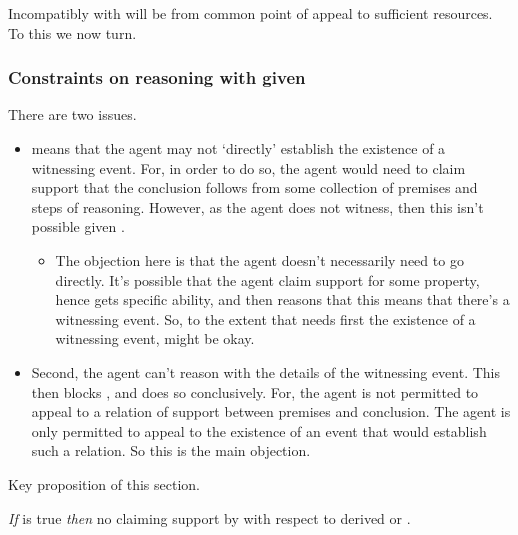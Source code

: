 \begin{note}
  Incompatibly with \ESU{} will be from common point of appeal to sufficient resources.
  To this we now turn.
\end{note}

\subsubsection{Constraints on reasoning with \gsi{} given \ESU{}}
\label{sec:incomp-wr-ura}

\begin{note}
  \color{red}
  There are two issues.
  \begin{itemize}
  \item \ESU{} means that the agent may not `directly' establish the existence of a witnessing event.
    For, in order to do so, the agent would need to claim support that the conclusion follows from some collection of premises and steps of reasoning.
    However, as the agent does not witness, then this isn't possible given \ESU{}.
    \begin{itemize}
    \item The objection here is that the agent doesn't necessarily need to go directly.
      It's possible that the agent claim support for some property, hence gets specific ability, and then reasons that this means that there's a witnessing event.
      So, to the extent that \WR{} needs first the existence of a witnessing event, \ESU{} might be okay.
    \end{itemize}
  \item Second, the agent can't reason with the details of the witnessing event.
    This then blocks \WR{}, and does so conclusively.
    For, the agent is not permitted to appeal to a relation of support between premises and conclusion.
    The agent is only permitted to appeal to the existence of an event that would establish such a relation.
    So this is the main objection.
  \end{itemize}
\end{note}

Key proposition of this section.

\begin{note}[Proposition]
  \begin{proposition}\label{mcA:WR-and-denied-claim}
    \emph{If} \ESU{} is true \emph{then} no claiming support by \ur{} with respect to derived \AR{} or \WR{}.
  \end{proposition}
\end{note}

